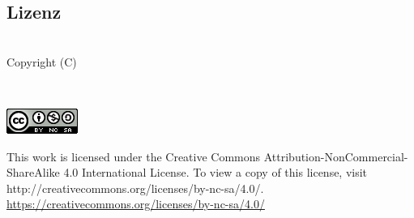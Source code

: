 
\subsection*{\centering Lizenz}
\begin{center}
\textit{\thetitle}\\
Copyright (C) \date \theauthor\\

\begin{center}
        \href{https://creativecommons.org/licenses/by-nc-sa/4.0/}{\includegraphics{pictures/CC_by_nc_sa.png}}
\end{center}
This work is licensed under the Creative Commons Attribution-NonCommercial-ShareAlike 4.0 International License. To view a copy of this license, visit http://creativecommons.org/licenses/by-nc-sa/4.0/.
\url{https://creativecommons.org/licenses/by-nc-sa/4.0/}
\end{center}
